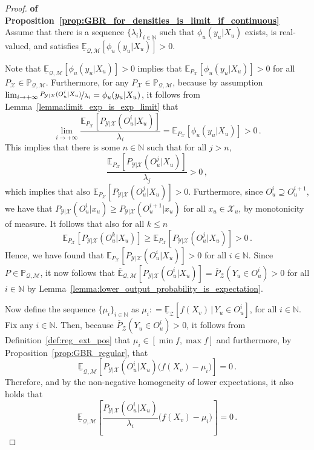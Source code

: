 \documentclass[3p]{elsarticle}
\newcommand{\nats}{\mathbb{N}}
\newcommand{\states}{\mathcal{X}}
\newcommand{\observs}{\mathcal{Y}}
\newcommand{\lexp}{\underline{\mathbb{E}}_{\rateset,\mathcal{M}}}
\newcommand{\uexp}{\overline{\mathbb{E}}_{\rateset,\mathcal{M}}}
\newcommand{\rateset}{\mathcal{Q}}
\newcommand{\coloneqq}{:\!=}
\begin{document}
\begin{proof}{\bf of Proposition~\ref{prop:GBR_for_densities_is_limit_if_continuous}~}
Assume that there is a sequence $\{\lambda_i\}_{i\in\nats}$ such that $\phi_u(y_u\vert X_u)$ exists, is real-valued, and satisfies $\lexp[\phi_u(y_u\vert X_u)] >0$. 

Note that $\lexp[\phi_u(y_u\vert X_u)] >0$ implies that $\mathbb{E}_{P_\states}[\phi_u(y_u\vert X_u)]>0$ for all $P_\states\in\mathbb{P}_{\rateset,\mathcal{M}}$. Furthermore, for any $P_\states\in\mathbb{P}_{\rateset,\mathcal{M}}$, because by assumption $\lim_{i\to+\infty}\nicefrac{P_{\observs\vert\states}(O_u^i\vert X_u)}{\lambda_i}=\phi_u(y_u\vert X_u)$, it follows from Lemma~\ref{lemma:limit_exp_is_exp_limit} that
\begin{equation*}
\lim_{i\to+\infty}\frac{\mathbb{E}_{P_\states}[P_{\observs\vert\states}(O_u^i\vert X_u)]}{\lambda_i} = \mathbb{E}_{P_\states}[\phi_u(y_u\vert X_u)] > 0\,.
\end{equation*}
This implies that there is some $n\in\nats$ such that for all $j>n$,
\begin{equation*}
\frac{\mathbb{E}_{P_\states}[P_{\observs\vert\states}(O_u^j\vert X_u)]}{\lambda_j} > 0\,,
\end{equation*}
which implies that also $\mathbb{E}_{P_\states}[P_{\observs\vert\states}(O_u^j\vert X_u)] >0$. Furthermore, since $O_u^i\supseteq O_u^{i+1}$, we have that $P_{\observs\vert\states}(O_u^i\vert x_u)\geq P_{\observs\vert\states}(O_u^{i+1}\vert x_u)$ for all $x_u\in\states_u$, by monotonicity of measure. It follows that also for all $k\leq n$
\begin{equation*}
\mathbb{E}_{P_\states}[P_{\observs\vert\states}(O_u^k\vert X_u)] \geq \mathbb{E}_{P_\states}[P_{\observs\vert\states}(O_u^j\vert X_u)] > 0\,.
\end{equation*}
Hence, we have found that $\mathbb{E}_{P_\states}[P_{\observs\vert\states}(O_u^i\vert X_u)]>0$ for all $i\in\nats$. Since $P\in\mathbb{P}_{\rateset,\mathcal{M}}$, it now follows that $\uexp[P_{\observs\vert\states}(O_u^i\vert X_u)]=\overline{P}_{\mathcal{Z}}(Y_u\in O_u^i)>0$ for all $i\in\nats$ by Lemma~\ref{lemma:lower_output_probability_is_expectation}.

Now define the sequence $\{\mu_i\}_{i\in\nats}$ as $\mu_i\coloneqq \underline{\mathbb{E}}_\mathcal{Z}[f(X_v)\,\vert\,Y_u\in O_u^i]$, for all $i\in\nats$.
Fix any $i\in\nats$. Then, because $\overline{P}_{\mathcal{Z}}(Y_u\in O_u^i)>0$, it follows from Definition~\ref{def:reg_ext_pos} that $\mu_i\in[\min f, \max f]$ and furthermore, by Proposition~\ref{prop:GBR_regular}, that
\begin{equation*}
\lexp[P_{\observs\vert\states}(O_u^i\vert X_u)\bigl(f(X_v) - \mu_i\bigr)] = 0\,.
\end{equation*}
Therefore, and by the non-negative homogeneity of lower expectations, it also holds that
\begin{equation}\label{eq:nat_ext_limit:steps_are_roots}
\lexp\left[\frac{P_{\observs\vert\states}(O_u^i\vert X_u)}{\lambda_i}\bigl(f(X_v) - \mu_i\bigr)\right] = 0\,.
\end{equation}


\end{proof}
\end{document}
